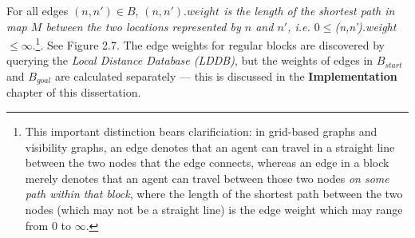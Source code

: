 \documentclass[12pt,notitlepage]{report}
\begin{document}
\noindent For all edges $(n,n') \in B$, {\em $(n,n').weight$ is the length of the shortest path in map $M$ between the two locations represented by $n$ and $n'$, i.e. $0 \leq $(n,n').weight$ \leq \infty$}.\footnote{This important distinction bears clarificiation: in grid-based graphs and visibility graphs, an edge denotes that an agent can travel in a straight line between the two nodes that the edge connects, whereas an edge in a block merely denotes that an agent can travel between those two nodes {\em on some path within that block}, where the length of the shortest path between the two nodes (which may not be a straight line) is the edge weight which may range from $0$ to $\infty$.}. See Figure 2.7. The edge weights for regular blocks are discovered by querying the {\em Local Distance Database (LDDB)}, but the weights of edges in $B_{start}$ and $B_{goal}$ are calculated separately --- this is discussed in the {\bfseries Implementation} chapter of this dissertation.\\
\end{document}
